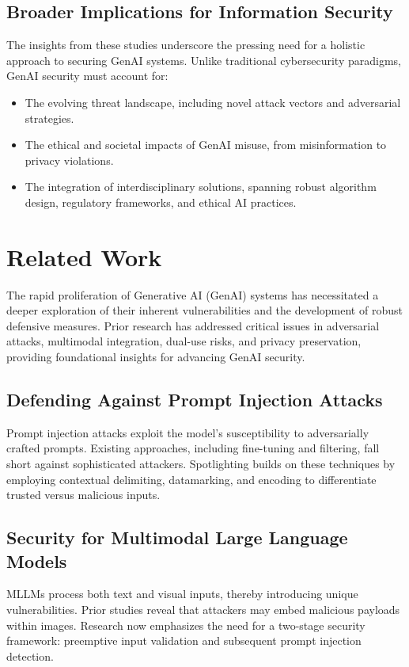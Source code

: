 \documentclass[journal]{IEEEtran}  %
\begin{document}
\subsection{Broader Implications for Information Security}
The insights from these studies underscore the pressing need for a holistic approach to securing GenAI systems. Unlike traditional cybersecurity paradigms, GenAI security must account for:
\begin{itemize}
    \item The evolving threat landscape, including novel attack vectors and adversarial strategies.
    \item The ethical and societal impacts of GenAI misuse, from misinformation to privacy violations.
    \item The integration of interdisciplinary solutions, spanning robust algorithm design, regulatory frameworks, and ethical AI practices.
\end{itemize}

\section{Related Work}

The rapid proliferation of Generative AI (GenAI) systems has necessitated a deeper exploration of their inherent vulnerabilities and the development of robust defensive measures. Prior research has addressed critical issues in adversarial attacks, multimodal integration, dual-use risks, and privacy preservation, providing foundational insights for advancing GenAI security.

\subsection{Defending Against Prompt Injection Attacks}
Prompt injection attacks exploit the model's susceptibility to adversarially crafted prompts. Existing approaches, including fine-tuning and filtering, fall short against sophisticated attackers. Spotlighting builds on these techniques by employing contextual delimiting, datamarking, and encoding to differentiate trusted versus malicious inputs.

\subsection{Security for Multimodal Large Language Models}
MLLMs process both text and visual inputs, thereby introducing unique vulnerabilities. Prior studies reveal that attackers may embed malicious payloads within images. Research now emphasizes the need for a two-stage security framework: preemptive input validation and subsequent prompt injection detection.
\end{document}
